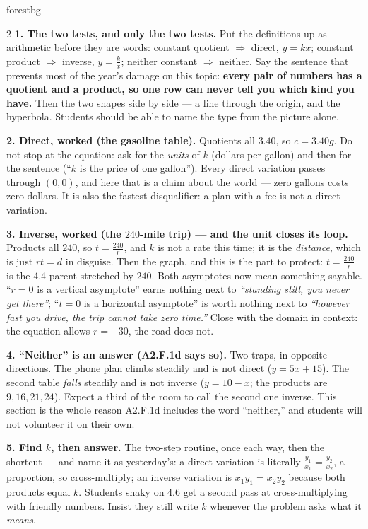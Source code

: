 \documentclass[10pt]{article}
\begin{document}
\begin{skillbox}[Lesson]{forestbg}
\begin{multicols}{2}
\textbf{1. The two tests, and only the two tests.} Put the definitions up as arithmetic before they are
words: constant quotient $\Rightarrow$ direct, $y=kx$; constant product $\Rightarrow$ inverse,
$y=\frac kx$; neither constant $\Rightarrow$ neither. Say the sentence that prevents most of the
year's damage on this topic: \textbf{every pair of numbers has a quotient and a product, so one row can
never tell you which kind you have.} Then the two shapes side by side --- a line through the origin, and
the hyperbola. Students should be able to name the type from the picture alone.

\textbf{2. Direct, worked (the gasoline table).} Quotients all $3.40$, so $c=3.40g$. Do not stop at the
equation: ask for the \emph{units} of $k$ (dollars per gallon) and then for the sentence (``$k$ is the
price of one gallon''). Every direct variation passes through $(0,0)$, and here that is a claim about
the world --- zero gallons costs zero dollars. It is also the fastest disqualifier: a plan with a fee is
not a direct variation.

\textbf{3. Inverse, worked (the $240$-mile trip) --- and the unit closes its loop.} Products all $240$,
so $t=\frac{240}{r}$, and $k$ is not a rate this time; it is the \emph{distance}, which is just
$rt=d$ in disguise. Then the graph, and this is the part to protect: $t=\frac{240}{r}$ is the 4.4 parent
stretched by $240$. Both asymptotes now mean something sayable. ``$r=0$ is a vertical asymptote'' earns
nothing next to \emph{``standing still, you never get there''}; ``$t=0$ is a horizontal asymptote'' is
worth nothing next to \emph{``however fast you drive, the trip cannot take zero time.''} Close with the
domain in context: the equation allows $r=-30$, the road does not.

\columnbreak

\textbf{4. ``Neither'' is an answer (A2.F.1d says so).} Two traps, in opposite directions. The phone
plan climbs steadily and is not direct ($y=5x+15$). The second table \emph{falls} steadily and is not
inverse ($y=10-x$; the products are $9,16,21,24$). Expect a third of the room to call the second one
inverse. This section is the whole reason A2.F.1d includes the word ``neither,'' and students will not
volunteer it on their own.

\textbf{5. Find $k$, then answer.} The two-step routine, once each way, then the shortcut --- and name
it as yesterday's: a direct variation is literally $\frac{y_1}{x_1}=\frac{y_2}{x_2}$, a proportion, so
cross-multiply; an inverse variation is $x_1y_1=x_2y_2$ because both products equal $k$. Students shaky
on 4.6 get a second pass at cross-multiplying with friendly numbers. Insist they still write $k$ whenever
the problem asks what it \emph{means}.


\end{multicols}
\end{skillbox}
\end{document}

